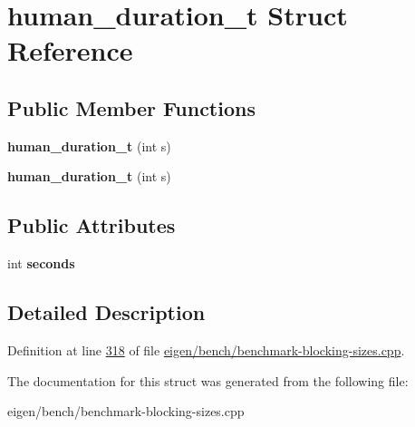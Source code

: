 \hypertarget{structhuman__duration__t}{}\section{human\+\_\+duration\+\_\+t Struct Reference}
\label{structhuman__duration__t}
\subsection*{Public Member Functions}
\begin{DoxyCompactItemize}
\item 
\mbox{\label{structhuman__duration__t_a9051f47e2b5c02b10b95e29b85eaafe6}} 
{\bfseries human\+\_\+duration\+\_\+t} (int s)
\item 
\mbox{\label{structhuman__duration__t_a9051f47e2b5c02b10b95e29b85eaafe6}} 
{\bfseries human\+\_\+duration\+\_\+t} (int s)
\end{DoxyCompactItemize}
\subsection*{Public Attributes}
\begin{DoxyCompactItemize}
\item 
\mbox{\label{structhuman__duration__t_a2c89c5f1c14360bc1c00d55897992185}} 
int {\bfseries seconds}
\end{DoxyCompactItemize}


\subsection{Detailed Description}


Definition at line \hyperlink{eigen_2bench_2benchmark-blocking-sizes_8cpp_source_l00318}{318} of file \hyperlink{eigen_2bench_2benchmark-blocking-sizes_8cpp_source}{eigen/bench/benchmark-\/blocking-\/sizes.\+cpp}.



The documentation for this struct was generated from the following file\+:\begin{DoxyCompactItemize}
\item 
eigen/bench/benchmark-\/blocking-\/sizes.\+cpp\end{DoxyCompactItemize}
